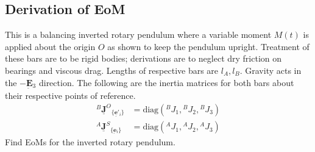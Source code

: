 \documentclass[12pt]{article}
\newcommand{\vb}[1]{{\underset{\tilde{}}{\mathbf{#1}}}}
\newcommand{\mb}[1]{\underline{\mathbf{#1}}}
\newcommand{\bas}[1]{\{ \vb{#1}{}_i \}}
\begin{document}
\subsection{Derivation of EoM}\label{sec:eom-derivation}
This is a balancing inverted rotary pendulum where a variable moment $M(t)$ is applied about the origin $O$ as shown to keep the pendulum upright. Treatment of these bars are to be rigid bodies; derivations are to neglect dry friction on bearings and viscous drag. Lengths of respective bars are $l{}_A, l{}_B$. Gravity acts in the $-\vb{E}{}_3$ direction. The following are the inertia matrices for both bars about their respective points of reference.
\[
\begin{aligned}
    {}^B\mb{J}^O{}_{\bas{e'}} &= \text{diag}({}^B J{}_1, {}^B J{}_2, {}^B J{}_3) \\
    {}^A\mb{J}^S{}_{\bas{e}} &= \text{diag}({}^A J{}_1, {}^A J{}_2, {}^A J{}_3)
\end{aligned}
\]
Find EoMs for the inverted rotary pendulum.
\end{document}
